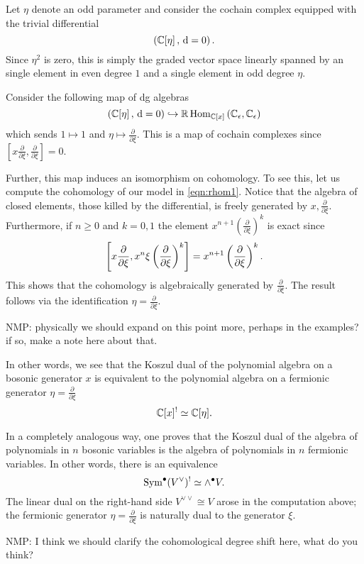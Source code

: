\documentclass[11pt]{amsart}
\def\natalie#1{{\textcolor{green!65!black}{NMP: {#1}}}}
\begin{document}
Let $\eta$ denote an odd parameter and consider the cochain complex equipped with the trivial differential
\[
 \left(\mathbb C[\eta] \, , \, {\rm d} = 0 \right) .
\]
Since $\eta^2$ is zero, this is simply the graded vector space linearly spanned by an single element in even degree $1$ and a single element in odd degree $\eta$. 

Consider the following map of dg algebras
\[
\left(\mathbb C[\eta] \, , \, {\rm d} = 0 \right) \hookrightarrow \mathbb{R}\operatorname{Hom}_{\mathbb C[x]} \left(\mathbb C_\epsilon, \mathbb C_\epsilon\right) 
\]
which sends $1 \mapsto 1$ and $\eta \mapsto \frac{\partial}{\partial \xi}$. 
This is a map of cochain complexes since $\left[x \frac{\partial}{\partial \xi} , \frac{\partial}{\partial \xi}\right] = 0$.

Further, this map induces an isomorphism on cohomology. 
To see this, let us compute the cohomology of our model in \eqref{eqn:rhom1}. 
Notice that the algebra of closed elements, those killed by the differential, is freely generated by $x, \frac{\partial}{\partial \xi}$. 
Furthermore, if $n \geq 0$ and $k = 0,1$ the element $x^{n+1}\left(\frac{\partial}{\partial \xi}\right)^k$ is exact since 
\[
\left[x \frac{\partial}{\partial \xi} , x^n \xi \left(\frac{\partial}{\partial \xi}\right)^k \right] = x^{n+1} \left(\frac{\partial}{\partial \xi}\right)^k . \\
\]
This shows that the cohomology is algebraically generated by $\frac{\partial}{\partial \xi}$. 
The result follows via the identification $\eta = \frac{\partial}{\partial \xi}$. 

\natalie{physically we should expand on this point more, perhaps in the examples? if so, make a note here about that.}

In other words, we see that the Koszul dual of the polynomial algebra on a bosonic generator $x$ is equivalent to the polynomial algebra on a fermionic generator $\eta = \frac{\partial}{\partial \xi}$
\[
\mathbb C[x]^! \simeq \mathbb C[\eta] .
\]

In a completely analogous way, one proves that the Koszul dual of the algebra of polynomials in $n$ bosonic variables is the algebra of polynomials in $n$ fermionic variables. 
In other words, there is an equivalence
\[
\operatorname{Sym}^\bullet (V^\vee)^! \simeq \wedge^\bullet V .
\]
The linear dual on the right-hand side $V^{\vee \vee} \cong V$ arose in the computation above; the fermionic generator $\eta = \frac{\partial}{\partial \xi}$ is naturally dual to the generator $\xi$. 

\natalie{I think we should clarify the cohomological degree shift here, what do you think?}
\end{document}
